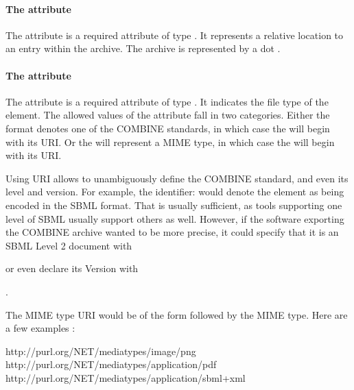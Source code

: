 \paragraph{The  attribute}
The  attribute is a required attribute of type 
. It represents a relative location to an entry within the 
archive. The archive is represented by a dot . 

\paragraph{The  attribute}
The  attribute is a required attribute of type . It 
indicates the file type of the \Content element. The allowed values of the 
 attribute fall in two categories. Either the format 
denotes one of the COMBINE standards, in which case the  
will begin with its  URI. Or the 
 will represent a MIME type, in which case the  
will begin with its  URI. 

Using  URI allows to unambiguously define the COMBINE standard, and even its level and version. For example, the identifier:  would denote the \Content 
element as being encoded in the SBML format. That is usually sufficient, as tools supporting one level of SBML usually
support others as well. However, if the software exporting the COMBINE archive wanted to be more precise, it could specify that it is an SBML Level 2 document with 

\begin{center}
\end{center}

or even declare its Version with 

\begin{center}
.
\end{center}

The MIME type  URI would be of the form 
followed by the MIME type. Here are a few examples :

\begin{example}
    http://purl.org/NET/mediatypes/image/png
    http://purl.org/NET/mediatypes/application/pdf
    http://purl.org/NET/mediatypes/application/sbml+xml
\end{example}

